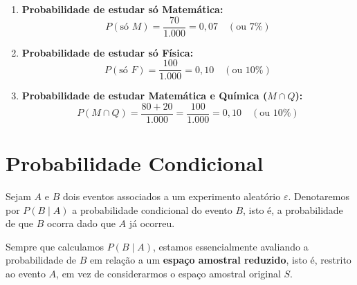 \begin{enumerate}
    \item[a)] \textbf{Probabilidade de estudar só Matemática:}
    \[
    P(\text{só } M) = \frac{70}{1.000} = 0,07 \quad (\text{ou } 7\%)
    \]

    \item[b)] \textbf{Probabilidade de estudar só Física:}
    \[
    P(\text{só } F) = \frac{100}{1.000} = 0,10 \quad (\text{ou } 10\%)
    \]

    \item[c)] \textbf{Probabilidade de estudar Matemática e Química ($M \cap Q$):}
    \[
    P(M \cap Q) = \frac{80 + 20}{1.000} = \frac{100}{1.000} = 0,10 \quad (\text{ou } 10\%)
    \]
\end{enumerate}












































\section{Probabilidade Condicional}

Sejam $A$ e $B$ dois eventos associados a um experimento aleatório $\varepsilon$.
Denotaremos por $P(B\mid A)$ a probabilidade condicional do evento $B$,
isto é, a probabilidade de que $B$ ocorra dado que $A$ já ocorreu.\vskip0.3cm

Sempre que calculamos $P(B\mid A)$, estamos essencialmente avaliando a probabilidade de $B$
em relação a um \textbf{espaço amostral reduzido}, isto é, restrito ao evento $A$,
em vez de considerarmos o espaço amostral original $S$.\vskip0.3cm

